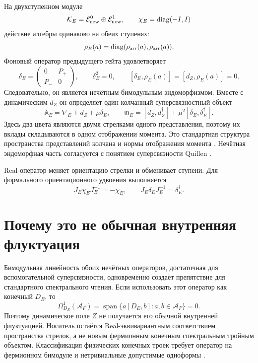 На двухступенном модуле
\begin{equation}
 \mathcal K_E=\mathcal E_{\rm new}^{0}\oplus
 \mathcal E_{\rm new}^{1},
 \qquad
 \chi_E=\operatorname{diag}(-I,I)
 \label{eq:v7-real-arrow-two-term-module}
\end{equation}
действие алгебры одинаково на обеих ступенях:
\begin{equation}
 \rho_E(a)=\operatorname{diag}(\rho_{\rm arr}(a),
                                \rho_{\rm arr}(a)).
 \label{eq:v7-real-arrow-algebra-action}
\end{equation}
Фоновый оператор предыдущего гейта удовлетворяет
\begin{equation}
 \delta_E=\begin{pmatrix}0&P_+\\P_-&0\end{pmatrix},
 \qquad
 \delta_E^2=0,
 \qquad
 [\delta_E,\rho_E(a)]=[d_Z,\rho_E(a)]=0.
 \label{eq:v7-real-arrow-background-bimodule}
\end{equation}
Следовательно, он является нечётным бимодульным эндоморфизмом. Вместе с
динамическим $d_Z$ он определяет один колчанный суперсвязностный объект
\begin{equation}
 \mathbb A_E=\nabla_E+d_Z+\mu\delta_E,
 \qquad
 \mathfrak m_E=[d_Z,d_Z^\dagger]
 +\mu^2[\delta_E,\delta_E^\dagger].
 \label{eq:v7-real-arrow-superconnection}
\end{equation}
Здесь два цвета являются двумя стрелками одного представления, поэтому их
вклады складываются в одном отображении момента. Это стандартная структура
пространства представлений колчана и нормы отображения момента
\cite{v7-real-arrow-harada}. Нечётная эндоморфная часть согласуется с
понятием суперсвязности Quillen \cite{v7-real-arrow-quillen}.

Real-оператор меняет ориентацию стрелки и обменивает ступени. Для формального
ориентационного удвоения выполняется
\begin{equation}
 J_E\chi_EJ_E^{-1}=-\chi_E,
 \qquad
 J_E\delta_EJ_E^{-1}=\delta_E^\dagger.
 \label{eq:v7-real-arrow-real-structure}
\end{equation}

\section{Почему это не обычная внутренняя флуктуация}

Бимодульная линейность обоих нечётных операторов, достаточная для
вспомогательной суперсвязности,
одновременно создаёт препятствие для стандартного спектрального чтения.
Если использовать этот оператор как конечный $D_E$, то
\begin{equation}
 \Omega^1_{D_E}(\mathcal A_F)
 =\operatorname{span}\{a[D_E,b]:a,b\in\mathcal A_F\}=0.
 \label{eq:v7-real-arrow-inner-oneform-zero}
\end{equation}
Поэтому динамическое поле $Z$ не получается его обычной внутренней
флуктуацией. Носитель остаётся Real-эквивариантным соответствием пространства
стрелок, а не новым фермионным конечным спектральным тройным объектом.
Классификация физических конечных троек требует оператор на фермионном
бимодуле и нетривиальные допустимые одноформы \cite{v7-real-arrow-krajewski}.

